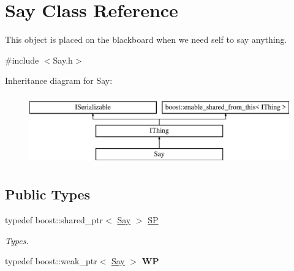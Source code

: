 \hypertarget{class_say}{}\section{Say Class Reference}
\label{class_say}


This object is placed on the blackboard when we need self to say anything.  




{\ttfamily \#include $<$Say.\+h$>$}

Inheritance diagram for Say\+:\begin{figure}[H]
\begin{center}
\leavevmode
\includegraphics[height=3.000000cm]{class_say}
\end{center}
\end{figure}
\subsection*{Public Types}
\begin{DoxyCompactItemize}
\item 
\mbox{\label{class_say_ac844265c12a229a008e755e2a3d1728d}} 
typedef boost\+::shared\+\_\+ptr$<$ \hyperlink{class_say}{Say} $>$ \hyperlink{class_say_ac844265c12a229a008e755e2a3d1728d}{SP}
\begin{DoxyCompactList}\small\item\em Types. \end{DoxyCompactList}\item 
\mbox{\label{class_say_aa56112c283d3f9f9c38353270c7b6f88}} 
typedef boost\+::weak\+\_\+ptr$<$ \hyperlink{class_say}{Say} $>$ {\bfseries WP}
\end{DoxyCompactItemize}
